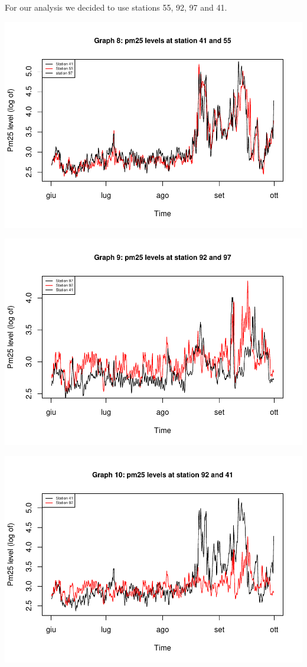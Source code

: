 \documentclass[
]{article}
\begin{document}
For our analysis we decided to use stations 55, 92, 97 and 41.

\begin{center}\includegraphics[width=0.75\linewidth,height=0.75\textheight]{finalproject_files/figure-latex/Graph 8-1} \end{center}

\begin{center}\includegraphics[width=0.75\linewidth,height=0.75\textheight]{finalproject_files/figure-latex/Graph 9-1} \end{center}

\begin{center}\includegraphics[width=0.75\linewidth,height=0.75\textheight]{finalproject_files/figure-latex/Graph 10-1} \end{center}
\end{document}
